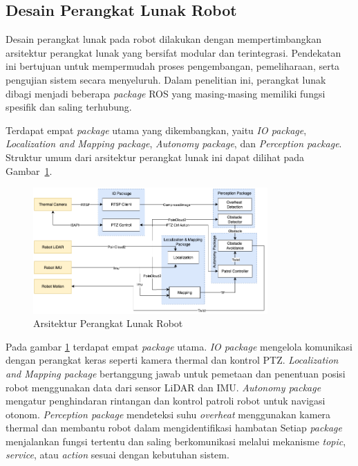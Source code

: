 \subsection{Desain Perangkat Lunak Robot}
Desain perangkat lunak pada robot dilakukan dengan mempertimbangkan arsitektur perangkat lunak yang bersifat modular dan terintegrasi. Pendekatan ini bertujuan untuk mempermudah proses pengembangan, pemeliharaan, serta pengujian sistem secara menyeluruh. Dalam penelitian ini, perangkat lunak dibagi menjadi beberapa \textit{package} ROS yang masing-masing memiliki fungsi spesifik dan saling terhubung.

Terdapat empat \textit{package} utama yang dikembangkan, yaitu \textit{IO package}, \textit{Localization and Mapping package}, \textit{Autonomy package}, dan \textit{Perception package}. Struktur umum dari arsitektur perangkat lunak ini dapat dilihat pada Gambar~\ref{fig:software-arch}.

\begin{figure}[H]
  \centering
  \includegraphics[width=0.8\textwidth]{gambar/bab3/sotware-arch.png}
  \caption{Arsitektur Perangkat Lunak Robot}
  \label{fig:software-arch}
\end{figure}

Pada gambar \ref{fig:software-arch} terdapat empat \emph{package} utama. \emph{IO package} mengelola komunikasi dengan perangkat keras seperti kamera thermal dan kontrol PTZ. \emph{Localization and Mapping package} bertanggung jawab untuk pemetaan dan penentuan posisi robot menggunakan data dari sensor LiDAR dan IMU. \emph{Autonomy package} mengatur penghindaran rintangan dan kontrol patroli robot untuk navigasi otonom. \emph{Perception package} mendeteksi suhu \emph{overheat} menggunakan kamera thermal dan membantu robot dalam mengidentifikasi hambatan Setiap \textit{package} menjalankan fungsi tertentu dan saling berkomunikasi melalui mekanisme \textit{topic}, \textit{service}, atau \textit{action} sesuai dengan kebutuhan sistem.

